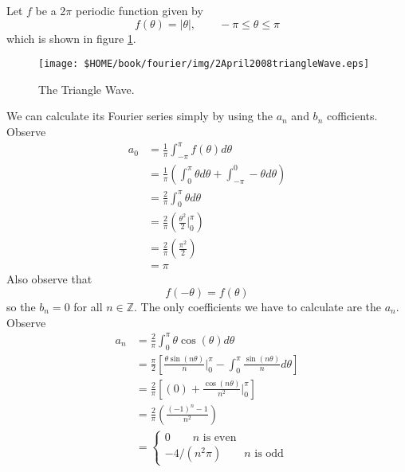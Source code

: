 \begin{ex}
Let $f$ be a 2$\pi$ periodic function given by
\begin{equation}
f(\theta)=|\theta|,\qquad -\pi\leq\theta\leq\pi
\end{equation}
which is shown in figure \ref{fig:2April2008:triangleWave}.
\begin{figure}
\begin{center}
\texttt{[image: \$HOME/book/fourier/img/2April2008triangleWave.eps]}
\end{center}
\caption{The Triangle Wave.}
\label{fig:2April2008:triangleWave}
\end{figure}
We can calculate its Fourier series simply by using the
$a_n$ and $b_n$ cofficients. Observe
\begin{subequations}
\begin{align}
a_{0} &= \frac{1}{\pi}\int^{\pi}_{-\pi}f(\theta)d\theta \\
&= \frac{1}{\pi}\left(\int^{\pi}_{0}\theta d\theta +
\int^{0}_{-\pi}-\theta d\theta\right) \\
&= \frac{2}{\pi}\int^{\pi}_{0}\theta d\theta \\
&= \frac{2}{\pi}\left(\frac{\theta^2}{2}\Big|^{\pi}_{0}\right)\\
&= \frac{2}{\pi}\left(\frac{\pi^2}{2}\right) \\
&= \pi
\end{align}
\end{subequations}
Also observe that
\begin{equation}
f(-\theta)=f(\theta)
\end{equation}
so the $b_{n}=0$ for all $n\in\mathbb{Z}$. The only
coefficients we have to calculate are the $a_{n}$. Observe
\begin{subequations}
\begin{align}
a_{n} &=
\frac{2}{\pi}\int^{\pi}_{0}\theta\cos(\theta)d\theta \\
&=\frac{\pi}{2}\left[\frac{\theta\sin(n\theta)}{n}\Big|^{\pi}_{0}-\int^{\pi}_{0}\frac{\sin(n\theta)}{n}d\theta\right]\\
&=\frac{2}{\pi}\left[\left(0\right)+\frac{\cos(n\theta)}{n^2}\Big|^{\pi}_{0}\right] \\
&= \frac{2}{\pi}\left(\frac{(-1)^{n}-1}{n^{2}}\right) \\
&= \begin{cases} 0\qquad \text{$n$ is even} \\
-4/(n^2\pi)\qquad\text{$n$ is odd} 

\end{cases}
\end{align}
\end{subequations}
\end{ex}

